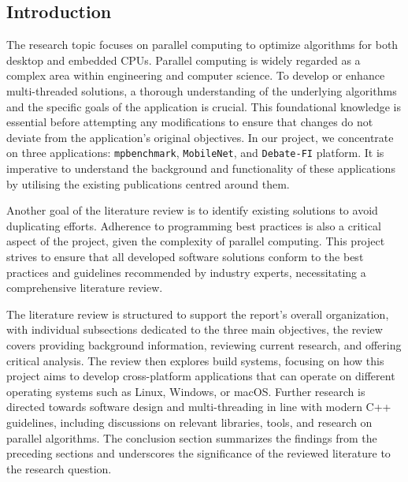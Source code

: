 \subsection{Introduction}
The research topic focuses on parallel computing to optimize algorithms for both desktop and embedded CPUs. Parallel computing is widely regarded as a complex area within engineering and computer science. To develop or enhance multi-threaded solutions, a thorough understanding of the underlying algorithms and the specific goals of the application is crucial. This foundational knowledge is essential before attempting any modifications to ensure that changes do not deviate from the application’s original objectives. In our project, we concentrate on three applications: \texttt{mpbenchmark}, \texttt{MobileNet}, and \texttt{Debate-FI} platform. It is imperative to understand the background and functionality of these applications by utilising the existing publications centred around them. 

Another goal of the literature review is to identify existing solutions to avoid duplicating efforts. Adherence to programming best practices is also a critical aspect of the project, given the complexity of parallel computing. This project strives to ensure that all developed software solutions conform to the best practices and guidelines recommended by industry experts, necessitating a comprehensive literature review.

The literature review is structured to support the report's overall organization, with individual subsections dedicated to the three main objectives, the review covers providing background information, reviewing current research, and offering critical analysis. The review then explores build systems, focusing on how this project aims to develop cross-platform applications that can operate on different operating systems such as Linux, Windows, or macOS. Further research is directed towards software design and multi-threading in line with modern C++ guidelines, including discussions on relevant libraries, tools, and research on parallel algorithms. The conclusion section summarizes the findings from the preceding sections and underscores the significance of the reviewed literature to the research question.

